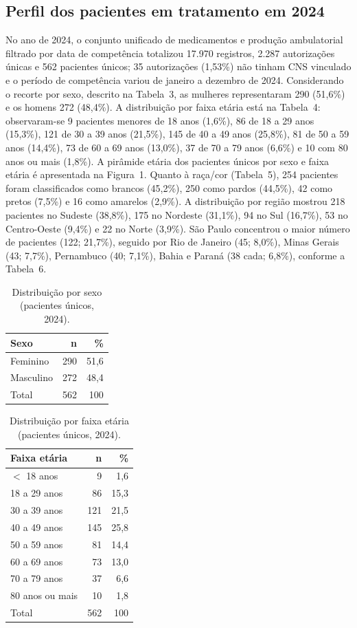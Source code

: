\documentclass[11pt,a4paper]{article}
\begin{document}
\subsection*{Perfil dos pacientes em tratamento em 2024}

No ano de 2024, o conjunto unificado de medicamentos e produção ambulatorial filtrado por data de competência totalizou 17.970 registros, 2.287 autorizações únicas e 562 pacientes únicos; 35 autorizações (1,53\%) não tinham CNS vinculado e o período de competência variou de janeiro a dezembro de 2024. Considerando o recorte por sexo, descrito na Tabela~3, as mulheres representaram 290 (51,6\%) e os homens 272 (48,4\%). A distribuição por faixa etária está na Tabela~4: observaram-se 9 pacientes menores de 18 anos (1,6\%), 86 de 18 a 29 anos (15,3\%), 121 de 30 a 39 anos (21,5\%), 145 de 40 a 49 anos (25,8\%), 81 de 50 a 59 anos (14,4\%), 73 de 60 a 69 anos (13,0\%), 37 de 70 a 79 anos (6,6\%) e 10 com 80 anos ou mais (1,8\%). A pirâmide etária dos pacientes únicos por sexo e faixa etária é apresentada na Figura~1. Quanto à raça/cor (Tabela~5), 254 pacientes foram classificados como brancos (45,2\%), 250 como pardos (44,5\%), 42 como pretos (7,5\%) e 16 como amarelos (2,9\%). A distribuição por região mostrou 218 pacientes no Sudeste (38,8\%), 175 no Nordeste (31,1\%), 94 no Sul (16,7\%), 53 no Centro-Oeste (9,4\%) e 22 no Norte (3,9\%). São Paulo concentrou o maior número de pacientes (122; 21,7\%), seguido por Rio de Janeiro (45; 8,0\%), Minas Gerais (43; 7,7\%), Pernambuco (40; 7,1\%), Bahia e Paraná (38 cada; 6,8\%), conforme a Tabela~6.

\begin{table}[ht]
\centering
\caption{Distribuição por sexo (pacientes únicos, 2024).}
\label{tab:3}
\begin{tabular}{lrr}
\toprule
\textbf{Sexo} & \textbf{n} & \textbf{\%} \\
\midrule
Feminino & 290 & 51,6 \\
Masculino & 272 & 48,4 \\
Total & 562 & 100 \\
\bottomrule
\end{tabular}
\end{table}

\begin{table}[ht]
\centering
\caption{Distribuição por faixa etária (pacientes únicos, 2024).}
\label{tab:4}
\begin{tabular}{lrr}
\toprule
\textbf{Faixa etária} & \textbf{n} & \textbf{\%} \\
\midrule
$<$ 18 anos & 9 & 1,6 \\
18 a 29 anos & 86 & 15,3 \\
30 a 39 anos & 121 & 21,5 \\
40 a 49 anos & 145 & 25,8 \\
50 a 59 anos & 81 & 14,4 \\
60 a 69 anos & 73 & 13,0 \\
70 a 79 anos & 37 & 6,6 \\
80 anos ou mais & 10 & 1,8 \\
Total & 562 & 100 \\
\bottomrule
\end{tabular}
\end{table}
\end{document}
